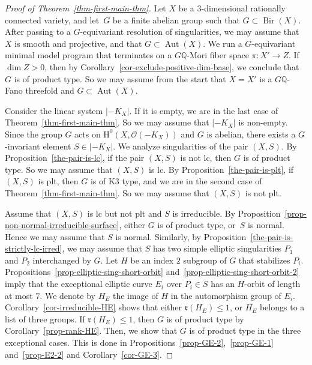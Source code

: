 \documentclass[11pt]{amsart}
\numberwithin{equation}{section}
\theoremstyle{definition}
\theoremstyle{remark}
\newcommand{\OOO}{\mathscr{O}}
\DeclareMathOperator{\Aut}{Aut}
\DeclareMathOperator{\Bir}{Bir}
\begin{document}
\begin{proof}[Proof of Theorem~\ref{thm-first-main-thm}]
Let $X$ be a $3$-dimensional rationally connected variety, and let~$G$ be a finite abelian group such that $G\subset \Bir(X)$. After passing to a $G$-equivariant resolution of singularities, we may assume that~$X$ is smooth and projective, and that $G\subset \Aut(X)$. We run a $G$-equivariant minimal model program that terminates on a $G\mathbb{Q}$-Mori fiber space $\pi\colon X'\to Z$. If $\dim Z>0$, then by Corollary~\ref{cor-exclude-positive-dim-base}, we conclude that $G$ is of product type. So we may assume from the start that $X=X'$ is a $G\mathbb{Q}$-Fano threefold and $G\subset \Aut(X)$. 

Consider the linear system $|-K_X|$. If it is empty, we are in the last case of Theorem~\ref{thm-first-main-thm}. So we may assume that $|-K_X|$ is non-empty. Since the group $G$ acts on 
$\mathrm{H}^0(X, \OOO(-K_X))$ and $G$ is abelian, there exists a $G$-invariant element $S\in |-K_X|$. We analyze singularities of the pair $(X, S)$. 
By Proposition~\ref{the-pair-is-lc}, if the pair $(X, S)$ is not lc, then $G$ is of product type. So we may assume that $(X, S)$ is lc. 
By Proposition~\ref{the-pair-is-plt}, if $(X, S)$ is plt, then $G$ is of K3 type, and we are in the second case of Theorem~\ref{thm-first-main-thm}. So we may assume that $(X, S)$ is not plt. 

Assume that $(X, S)$ is lc but not plt and $S$ is irreducible. By Proposition~\ref{prop-non-normal-irreducible-surface},  either $G$ is of product type, or~$S$ is normal. Hence we may assume that $S$ is normal. Similarly, by Proposition~\ref{the-pair-is-strictly-lc-irred}, we may assume that $S$ has two simple elliptic singularities $P_1$ and $P_2$ interchanged by $G$. 
Let $H$ be an index $2$ subgroup of $G$ that stabilizes $P_i$. 
Propositions~\ref{prop-elliptic-sing-short-orbit} and~\ref{prop-elliptic-sing-short-orbit-2} imply that the exceptional elliptic curve $E_i$ over $P_i\in S$ has an $H$-orbit of length at most $7$.  
We denote by $H_E$ the image of $H$ in the automorphism group of $E_i$.  
Corollary~\ref{cor-irreducible-HE} shows that either $\mathfrak{r}(H_E)\leq 1$, or $H_E$ belongs to a list of three groups. 
If $\mathfrak{r}(H_E)\leq 1$, then $G$ is of product type by Corollary~\ref{prop-rank-HE}. 
Then, we show that $G$ is of product type in the three exceptional cases. This is done in Propositions~\ref{prop-GE-2},~\ref{prop-GE-1} and~\ref{prop-E2-2} and Corollary~\ref{cor-GE-3}. 


\end{proof}
\end{document}
